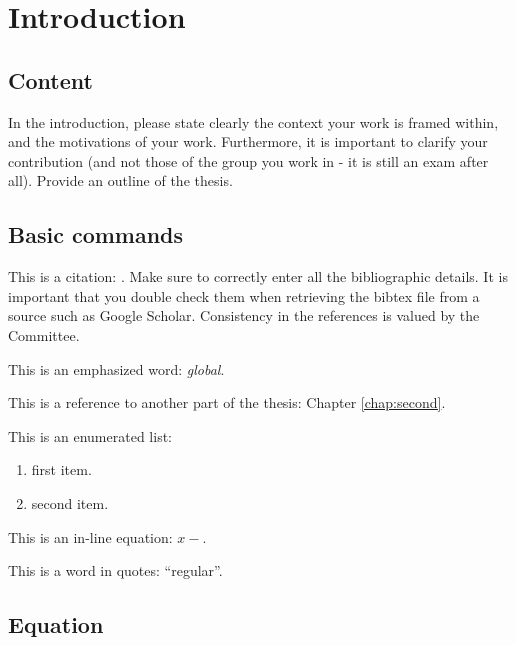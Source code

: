 
\chapter{Introduction}
\label{chap:first}
\ifpdf
    \graphicspath{{Chapter1/Figures/PNG/}{Chapter1/Figures/PDF/}{Chapter1/Figures/}{Chapter1/Figures/EPS/}}
\else
    \graphicspath{{Chapter1/Figures/EPS/}{Chapter1/Figures/}}
\fi


\section{Content}
In the introduction, please state clearly the context your work is framed within, and the motivations of your work. Furthermore, it is important to clarify your contribution (and not those of the group you work in - it is still an exam after all). Provide an outline of the thesis.


\section{Basic commands}
\label{sec:basic_commands}
This is a citation: \cite{cacciaActiveSonarbasedBottomfollowing1999}. Make sure to correctly enter all the bibliographic details. It is important that you double check them when retrieving the bibtex file from a source such as Google Scholar. Consistency in the references is valued by the Committee.

This is an emphasized word: \emph{global}.

This is a reference to another part of the thesis: Chapter \ref{chap:second}.

This is an enumerated list:
\begin{enumerate}
\item first item.
\item second item.
\end{enumerate}

This is an in-line equation: $x-$.

This is a word in quotes: ``regular''.

\section{Equation}
\label{sec:equation}

